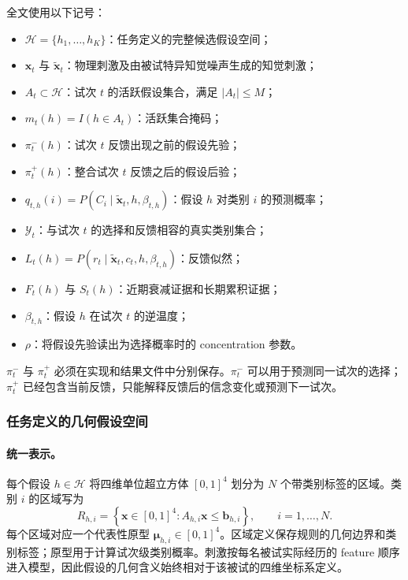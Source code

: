 全文使用以下记号：
\begin{itemize}
    \item $\mathcal H=\{h_1,\ldots,h_K\}$：任务定义的完整候选假设空间；
    \item $\mathbf x_t$ 与 $\widetilde{\mathbf x}_t$：物理刺激及由被试特异知觉噪声生成的知觉刺激；
    \item $A_t\subset\mathcal H$：试次 $t$ 的活跃假设集合，满足 $|A_t|\leq M$；
    \item $m_t(h)=I(h\in A_t)$：活跃集合掩码；
    \item $\pi_t^-(h)$：试次 $t$ 反馈出现之前的假设先验；
    \item $\pi_t^+(h)$：整合试次 $t$ 反馈之后的假设后验；
    \item $q_{t,h}(i)=P(C_i\mid\widetilde{\mathbf x}_t,h,\beta_{t,h})$：假设 $h$ 对类别 $i$ 的预测概率；
    \item $\mathcal Y_t$：与试次 $t$ 的选择和反馈相容的真实类别集合；
    \item $L_t(h)=P(r_t\mid\widetilde{\mathbf x}_t,c_t,h,\beta_{t,h})$：反馈似然；
    \item $F_t(h)$ 与 $S_t(h)$：近期衰减证据和长期累积证据；
    \item $\beta_{t,h}$：假设 $h$ 在试次 $t$ 的逆温度；
    \item $\rho$：将假设先验读出为选择概率时的 concentration 参数。
\end{itemize}

$\pi_t^-$ 与 $\pi_t^+$ 必须在实现和结果文件中分别保存。$\pi_t^-$ 可以用于预测同一试次的选择；$\pi_t^+$ 已经包含当前反馈，只能解释反馈后的信念变化或预测下一试次。


\subsubsection{任务定义的几何假设空间}

\paragraph{统一表示。}
每个假设 $h\in\mathcal H$ 将四维单位超立方体 $[0,1]^4$ 划分为 $N$ 个带类别标签的区域。类别 $i$ 的区域写为
\begin{equation}
    R_{h,i}
    =
    \left\{
        \mathbf x\in[0,1]^4:
        A_{h,i}\mathbf x\leq\mathbf b_{h,i}
    \right\},
    \qquad i=1,\ldots,N .
    \label{eq:modelv2-region}
\end{equation}
每个区域对应一个代表性原型 $\boldsymbol\mu_{h,i}\in[0,1]^4$。区域定义保存规则的几何边界和类别标签；原型用于计算试次级类别概率。刺激按每名被试实际经历的 feature 顺序进入模型，因此假设的几何含义始终相对于该被试的四维坐标系定义。

